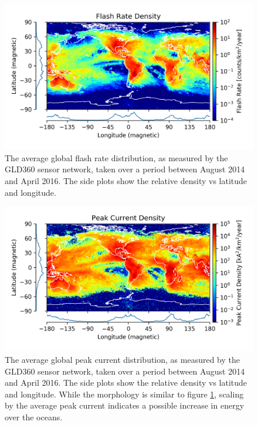 \begin{figure}[h!]
\begin{center}
\includegraphics{figures/flash_rate_density.png}
\end{center}
\caption[Average global flash rate]{The average global flash rate distribution, as measured by the GLD360 sensor network, taken over a period between August 2014 and April 2016. The side plots show the relative density vs latitude and longitude.}
\label{fig:flash_rate_density}
\end{figure}
\begin{figure}[h!]
\begin{center}
\includegraphics{figures/peak_current_density.png}
\end{center}
\caption[Average global peak current rate rate]{The average global peak current distribution, as measured by the GLD360 sensor network, taken over a period between August 2014 and April 2016. The side plots show the relative density vs latitude and longitude. While the morphology is similar to figure \ref{fig:flash_rate_density}, scaling by the average peak current indicates a possible increase in energy over the oceans.}
\label{fig:peak_current_density}
\end{figure}

